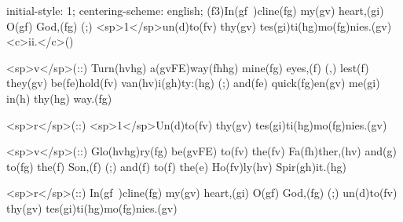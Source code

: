 initial-style: 1;
centering-scheme: english;
(f3)In(gf~)cline(fg) my(gv) heart,(gi) O(gf) God,(fg) (;) <sp>1</sp>un(d)to(fv) thy(gv) tes(gi)ti(hg)mo(fg)nies.(gv) <c>ii.</c>()

<sp>v</sp>(::) Turn(hvhg) a(gvFE)way(fhhg) mine(fg) eyes,(f) (,) lest(f) they(gv) be(fe)hold(fv) van(hv)i(gh)ty:(hg) (;) and(fe) quick(fg)en(gv) me(gi) in(h) thy(hg) way.(fg)

<sp>r</sp>(::) <sp>1</sp>Un(d)to(fv) thy(gv) tes(gi)ti(hg)mo(fg)nies.(gv)

<sp>v</sp>(::) Glo(hvhg)ry(fg) be(gvFE) to(fv) the(fv) Fa(fh)ther,(hv) and(g) to(fg) the(f) Son,(f) (;) and(f) to(f) the(e) Ho(fv)ly(hv) Spir(gh)it.(hg)

<sp>r</sp>(::) In(gf~)cline(fg) my(gv) heart,(gi) O(gf) God,(fg) (;) un(d)to(fv) thy(gv) tes(gi)ti(hg)mo(fg)nies.(gv)